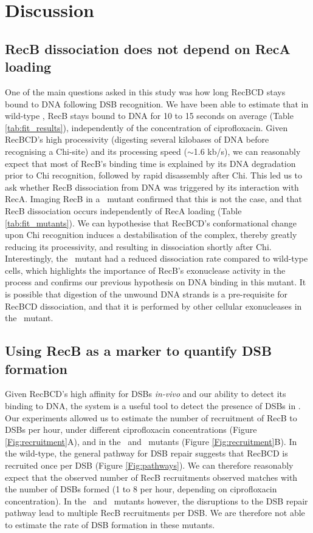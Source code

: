 \section*{Discussion}

\subsection*{RecB dissociation does not depend on RecA loading}
One of the main questions asked in this study was how long RecBCD stays bound to DNA following DSB recognition. We have been able to estimate that in wild-type \ecoli, RecB stays bound to DNA for 10 to 15 seconds on average (Table \ref{tab:fit_results}), independently of the concentration of ciprofloxacin. Given RecBCD's high processivity (digesting several kilobases of DNA before recognising a Chi-site) and its processing speed ($\sim$1.6 kb/s\cite{Wiktor2018}), we can reasonably expect that most of RecB's binding time is explained by its DNA degradation prior to Chi recognition, followed by rapid disassembly after Chi. This led us to ask whether RecB dissociation from DNA was triggered by its interaction with RecA. Imaging RecB in a \dreca\ mutant confirmed that this is not the case, and that RecB dissociation occurs independently of RecA loading (Table \ref{tab:fit_mutants}). We can hypothesise that RecBCD's conformational change upon Chi recognition induces a destabilisation of the complex, thereby greatly reducing its processivity, and resulting in dissociation shortly after Chi. Interestingly, the \geneteneighty\ mutant had a reduced dissociation rate compared to wild-type cells, which highlights the importance of RecB's exonuclease activity in the process and confirms our previous hypothesis on DNA binding in this mutant\cite{Lepore2023}. It is possible that digestion of the unwound DNA strands is a pre-requisite for RecBCD dissociation, and that it is performed by other cellular exonucleases in the \geneteneighty\ mutant.

\subsection*{Using RecB as a marker to quantify DSB formation}
Given RecBCD's high affinity for DSBs \emph{in-vivo} and our ability to detect its binding to DNA, the system is a useful tool to detect the presence of DSBs in \ecoli. Our experiments allowed us to estimate the number of recruitment of RecB to DSBs per hour, under different ciprofloxacin concentrations (Figure \ref{Fig:recruitment}A), and in the \dreca\ and \geneteneighty\ mutants (Figure \ref{Fig:recruitment}B). In the wild-type, the general pathway for DSB repair suggests that RecBCD is recruited once per DSB (Figure \ref{Fig:pathways}). We can therefore reasonably expect that the observed number of RecB recruitments observed matches with the number of DSBs formed (1 to 8 per hour, depending on ciprofloxacin concentration). In the \dreca\ and \geneteneighty\ mutants however, the disruptions to the DSB repair pathway lead to multiple RecB recruitments per DSB. We are therefore not able to estimate the rate of DSB formation in these mutants.

